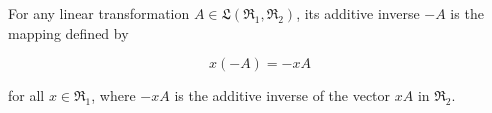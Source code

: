 For any linear transformation $A \in \mathfrak{L}(\mathfrak{R}_1, \mathfrak{R}_2)$, its additive inverse $-A$ is the mapping defined by

$$x(-A) = -xA$$

for all $x \in \mathfrak{R}_1$, where $-xA$ is the additive inverse of the vector $xA$ in $\mathfrak{R}_2$.
